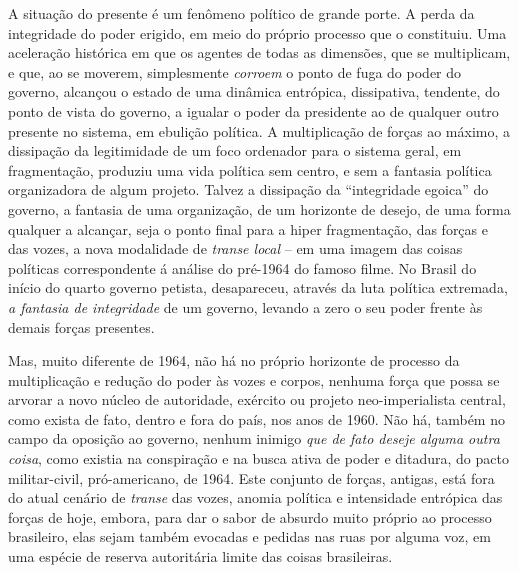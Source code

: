 A situação do presente é um fenômeno político de grande porte. A perda
da integridade do poder erigido, em meio do próprio processo que o
constituiu. Uma aceleração histórica em que os agentes de todas as
dimensões, que se multiplicam, e que, ao se moverem, simplesmente
\emph{corroem} o ponto de fuga do poder do governo, alcançou o estado de
uma dinâmica entrópica, dissipativa, tendente, do ponto de vista do
governo, a igualar o poder da presidente ao de qualquer outro presente
no sistema, em ebulição política. A multiplicação de forças ao máximo, a
dissipação da legitimidade de um foco ordenador para o sistema geral, em
fragmentação, produziu uma vida política sem centro, e sem a fantasia
política organizadora de algum projeto. Talvez a dissipação da
``integridade egoica'' do governo, a fantasia de uma organização, de um
horizonte de desejo, de uma forma qualquer a alcançar, seja o ponto
final para a hiper fragmentação, das forças e das vozes, a nova
modalidade de \emph{transe local} -- em uma imagem das coisas políticas
correspondente á análise do pré-1964 do famoso filme. No Brasil do
início do quarto governo petista, desapareceu, através da luta política
extremada, \emph{a fantasia de integridade} de um governo, levando a
zero o seu poder frente às demais forças presentes.

Mas, muito diferente de 1964, não há no próprio horizonte de processo da
multiplicação e redução do poder às vozes e corpos, nenhuma força que
possa se arvorar a novo núcleo de autoridade, exército ou projeto
neo-imperialista central, como exista de fato, dentro e fora do país,
nos anos de 1960. Não há, também no campo da oposição ao governo, nenhum
inimigo \emph{que de fato deseje alguma outra coisa}, como existia na
conspiração e na busca ativa de poder e ditadura, do pacto
militar-civil, pró-americano, de 1964. Este conjunto de forças, antigas,
está fora do atual cenário de \emph{transe} das vozes, anomia política e
intensidade entrópica das forças de hoje, embora, para dar o sabor de
absurdo muito próprio ao processo brasileiro, elas sejam também evocadas
e pedidas nas ruas por alguma voz, em uma espécie de reserva autoritária
limite das coisas brasileiras.


